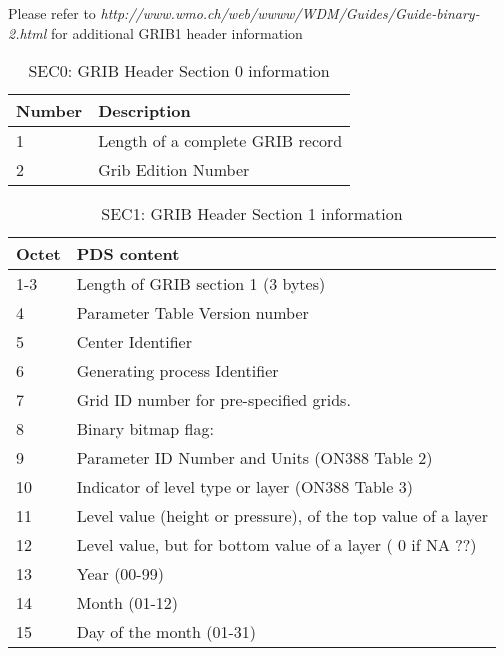 Please refer to \textsl{http://www.wmo.ch/web/wwww/WDM/Guides/Guide-binary-2.html} for additional GRIB1 header information\\

\begin{table}[H]
\centering
\caption{SEC0: GRIB Header Section 0 information}
\vspace{0.2in}
\begin{tabular}{l|l}
\hline
\hline
Number   & Description\\
\hline
\hline
1 & Length of a complete GRIB record \\
2 & Grib Edition Number \\
\hline
\hline
\end{tabular}
\label{table:sec0}
\end{table}

\begin{table}[H]
\centering
\caption{SEC1: GRIB Header Section 1 information}
\vspace{0.2in}
\begin{tabular}{l|l}
\hline
\hline
Octet  & PDS content\\
\hline
 1-3  &  Length of GRIB section 1 (3 bytes)   \\
    4  &  Parameter Table Version number    \\                       
    5  &  Center Identifier               \\                         
    6  &  Generating process Identifier     \\                                   
    7  &  Grid ID number for pre-specified grids. \\                       
    8  &  Binary bitmap flag:                  \\
    9  &  Parameter ID Number and Units (ON388 Table 2) \\                           
   10 &  Indicator of level type or layer (ON388 Table 3) \\                                    
   11 &  Level value (height or pressure), of the top value of a layer  \\                          
   12 &  Level value, but for bottom value of a layer ( 0 if NA ??) \\                         
   13 &  Year (00-99)      \\                                             
   14 &  Month (01-12)       \\                                           
   15 &  Day of the month (01-31) \\                                       

\end{tabular}
\end{table}
